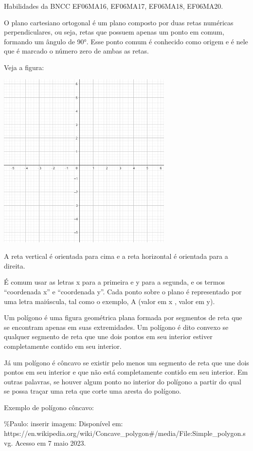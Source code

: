 Habilidades da BNCC EF06MA16, EF06MA17, EF06MA18, EF06MA20.

O plano cartesiano ortogonal é um plano composto por duas retas
numéricas perpendiculares, ou seja, retas que possuem apenas um ponto em
comum, formando um ângulo de 90°. Esse ponto comum é conhecido como
origem e é nele que é marcado o número zero de ambas as retas.

Veja a figura:

\includegraphics[width=3.42575in,height=3.5in]{./imgSAEB_6_MAT/media/image39.png}

A reta vertical é orientada para cima e a reta horizontal é orientada
para a direita.

É comum usar as letras x para a primeira e y para a segunda, e os termos
``coordenada x'' e ``coordenada y''. Cada ponto sobre o plano é
representado por uma letra maiúscula, tal como o exemplo, A (valor em x
, valor em y).

Um polígono é uma figura geométrica plana formada por segmentos de reta
que se encontram apenas em suas extremidades. Um polígono é dito convexo
se qualquer segmento de reta que une dois pontos em seu interior estiver
completamente contido em seu interior.

Já um polígono é côncavo se existir pelo menos um segmento de reta que
une dois pontos em seu interior e que não está completamente contido em
seu interior. Em outras palavras, se houver algum ponto no interior do
polígono a partir do qual se possa traçar uma reta que corte uma aresta
do polígono.

Exemplo de polígono côncavo:

\%Paulo: inserir imagem: Disponível em:
https://en.wikipedia.org/wiki/Concave\_polygon\#/media/File:Simple\_polygon.svg.
Acesso em 7 maio 2023.

